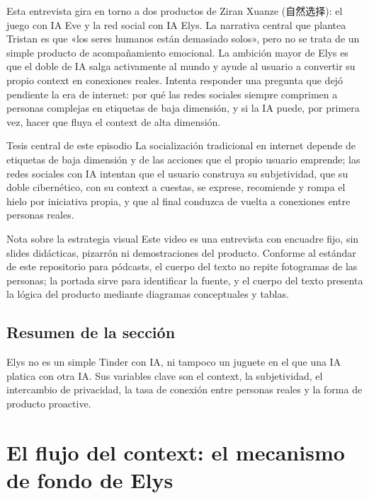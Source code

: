 \documentclass[a4paper]{article}
\begin{document}
Esta entrevista gira en torno a dos productos de Ziran Xuanze (自然选择): el juego con IA Eve y la red social con IA Elys. La narrativa central que plantea Tristan es que «los seres humanos están demasiado solos», pero no se trata de un simple producto de acompañamiento emocional. La ambición mayor de Elys es que el doble de IA salga activamente al mundo y ayude al usuario a convertir su propio context en conexiones reales. Intenta responder una pregunta que dejó pendiente la era de internet: por qué las redes sociales siempre comprimen a personas complejas en etiquetas de baja dimensión, y si la IA puede, por primera vez, hacer que fluya el context de alta dimensión.

\begin{importantbox}{Tesis central de este episodio}
La socialización tradicional en internet depende de etiquetas de baja dimensión y de las acciones que el propio usuario emprende; las redes sociales con IA intentan que el usuario construya su subjetividad, que su doble cibernético, con su context a cuestas, se exprese, recomiende y rompa el hielo por iniciativa propia, y que al final conduzca de vuelta a conexiones entre personas reales.
\end{importantbox}

\begin{knowledgebox}{Nota sobre la estrategia visual}
Este video es una entrevista con encuadre fijo, sin slides didácticas, pizarrón ni demostraciones del producto. Conforme al estándar de este repositorio para pódcasts, el cuerpo del texto no repite fotogramas de las personas; la portada sirve para identificar la fuente, y el cuerpo del texto presenta la lógica del producto mediante diagramas conceptuales y tablas.
\end{knowledgebox}

\subsection{Resumen de la sección}

Elys no es un simple Tinder con IA, ni tampoco un juguete en el que una IA platica con otra IA. Sus variables clave son el context, la subjetividad, el intercambio de privacidad, la tasa de conexión entre personas reales y la forma de producto proactive.
\section{El flujo del context: el mecanismo de fondo de Elys}
\end{document}
